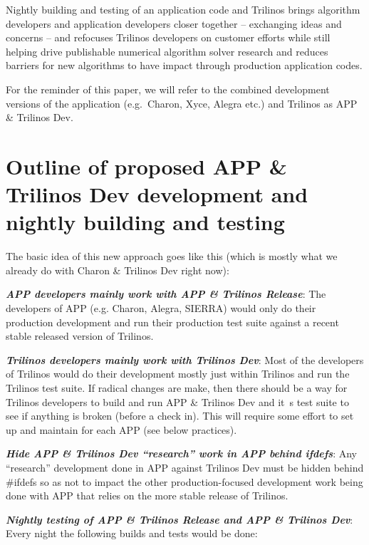 \documentclass[pdf,ps2pdf,11pt]{SANDreport}
\begin{document}
Nightly building and testing of an application code and Trilinos
brings algorithm developers and application developers closer together --
exchanging ideas and concerns -- and refocuses Trilinos developers on customer 
efforts while still helping drive publishable numerical algorithm solver
research and reduces barriers for new algorithms to have impact through
production application codes.

For the reminder of this paper, we will refer to the combined development
versions of the application (e.g.\ Charon, Xyce, Alegra etc.) and Trilinos as
APP \& Trilinos Dev.


%
{}\section{Outline of proposed APP \& Trilinos Dev development and nightly
building and testing}
%

The basic idea of this new approach goes like this (which is mostly what we
already do with Charon \& Trilinos Dev right now):

{}\textit{\textbf{APP developers mainly work with APP \& Trilinos Release}}:
The developers of APP (e.g. Charon, Alegra, SIERRA) would only do their
production development and run their production test suite against a recent
stable released version of Trilinos.

{}\textit{\textbf{Trilinos developers mainly work with Trilinos Dev}}: Most of
the developers of Trilinos would do their development mostly just within
Trilinos and run the Trilinos test suite.  If radical changes are make, then
there should be a way for Trilinos developers to build and run APP \& Trilinos
Dev and it~s test suite to see if anything is broken (before a check in).
This will require some effort to set up and maintain for each APP (see below
practices).

{}\textit{\textbf{Hide APP \& Trilinos Dev ``research'' work in APP behind
ifdefs}}: Any ``research'' development done in APP against Trilinos Dev must
be hidden behind {}\#ifdefs so as not to impact the other production-focused
development work being done with APP that relies on the more stable release of
Trilinos.

{}\textit{\textbf{Nightly testing of APP \& Trilinos Release and APP \& Trilinos
Dev}}: Every night the following builds and tests would be done:
\end{document}
